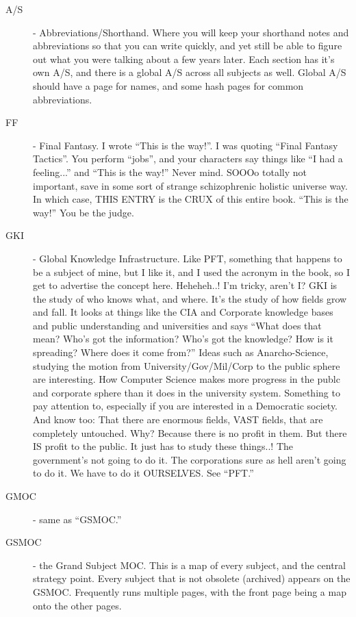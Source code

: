 \documentclass[oneside]{book}
\begin{document}
\begin{description}
\item[A/S] - Abbreviations/Shorthand. Where you will keep your shorthand
notes and abbreviations so that you can write quickly, and yet still
be able to figure out what you were talking about a few years
later. Each section has it's own A/S, and there is a global A/S across
all subjects as well. Global A/S should have a page for names, and
some hash pages for common abbreviations.

\item[FF] - Final Fantasy. I wrote ``This is the way!''. I was quoting ``Final
Fantasy Tactics''. You perform ``jobs'', and your characters say things
like ``I had a feeling...'' and ``This is the way!'' Never mind. SOOOo
totally not important, save in some sort of strange schizophrenic
holistic universe way. In which case, THIS ENTRY is the CRUX of this
entire book. ``This is the way!'' You be the judge.

\item[GKI] - Global Knowledge Infrastructure. Like PFT, something that
happens to be a subject of mine, but I like it, and I used the acronym
in the book, so I get to advertise the concept here. Heheheh..! I'm
tricky, aren't I? GKI is the study of who knows what, and where. It's
the study of how fields grow and fall. It looks at things like the CIA
and Corporate knowledge bases and public understanding and
universities and says ``What does that mean? Who's got the information?
Who's got the knowledge? How is it spreading? Where does it come
from?'' Ideas such as Anarcho-Science, studying the motion from
University/Gov/Mil/Corp to the public sphere are interesting. How
Computer Science makes more progress in the publc and corporate sphere
than it does in the university system. Something to pay attention to,
especially if you are interested in a Democratic society. And know
too: That there are enormous fields, VAST fields, that are completely
untouched. Why? Because there is no profit in them. But there IS
profit to the public. It just has to study these things..! The
government's not going to do it. The corporations sure as hell aren't
going to do it. We have to do it OURSELVES. See ``PFT.''

\item[GMOC] - same as ``GSMOC.''

\item[GSMOC] - the Grand Subject MOC. This is a map of every subject, and the
central strategy point. Every subject that is not obsolete (archived)
appears on the GSMOC. Frequently runs multiple pages, with the front
page being a map onto the other pages.


\end{description}
\end{document}

